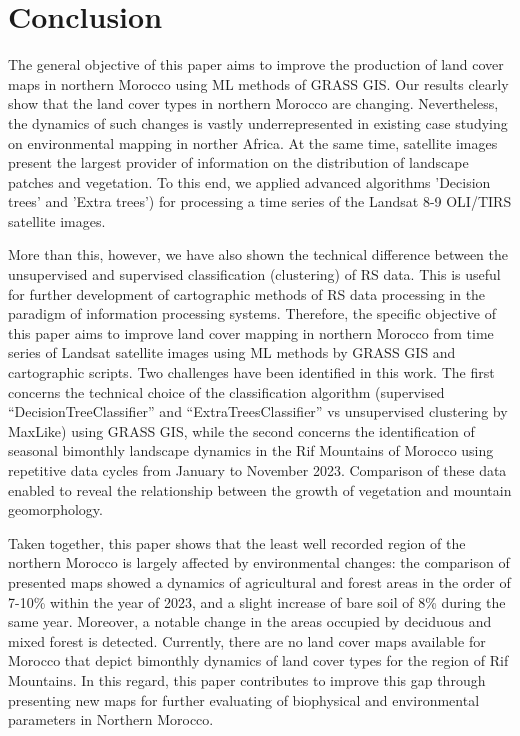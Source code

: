 \documentclass[geomatics,article,submit,pdftex,moreauthors]{Definitions/mdpi}
\begin{document}
\section{Conclusion}

The general objective of this paper aims to improve the production of land cover maps in northern Morocco using ML methods of GRASS GIS. Our results clearly show that the land cover types in northern Morocco are changing. Nevertheless, the dynamics of such changes is vastly underrepresented in existing case studying on environmental mapping in norther Africa. At the same time, satellite images present the largest provider of information on the distribution of landscape patches and vegetation. To this end, we applied advanced algorithms 'Decision trees' and 'Extra trees') for processing a time series of the Landsat 8-9 OLI/TIRS satellite images. 

More than this, however, we have also shown the technical difference between the unsupervised and supervised classification (clustering) of RS data. This is useful for further development of cartographic methods of RS data processing in the paradigm of information processing systems. Therefore, the specific objective of this paper aims to improve land cover mapping in northern Morocco from time series of Landsat satellite images using ML methods by GRASS GIS and cartographic scripts. Two challenges have been identified in this work. The first concerns the technical choice of the classification algorithm (supervised “DecisionTreeClassifier” and “ExtraTreesClassifier” vs unsupervised clustering by MaxLike) using GRASS GIS, while the second concerns the identification of seasonal bimonthly landscape dynamics in the Rif Mountains of Morocco using repetitive data cycles from January to November 2023. Comparison of these data enabled to reveal the relationship between the growth of vegetation and mountain geomorphology.

Taken together, this paper shows that the least well recorded region of the northern Morocco is largely affected by environmental changes: the comparison of presented maps showed a dynamics of agricultural and forest areas in the order of 7-10\% within the year of 2023, and a slight increase of bare soil of 8\% during the same year. Moreover, a notable change in the areas occupied by deciduous and mixed forest is detected. Currently, there are no land cover maps available for Morocco that depict bimonthly dynamics of land cover types for the region of Rif Mountains. In this regard, this paper contributes to improve this gap through presenting new maps for further evaluating of biophysical and environmental parameters in Northern Morocco.
\end{document}
